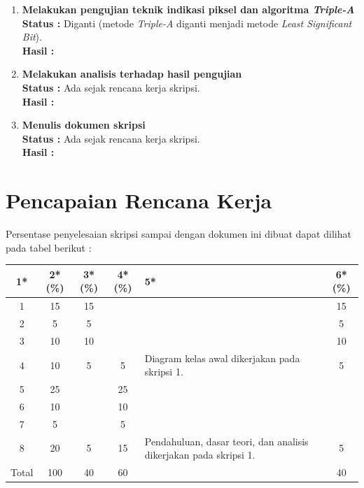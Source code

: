 \documentclass[a4paper,twoside]{article}
\begin{document}
\begin{enumerate}
		\item \textbf{Melakukan pengujian teknik indikasi piksel dan algoritma \textit{Triple-A}}\\
		{\bf Status :} Diganti (metode \textit{Triple-A} diganti menjadi metode \textit{Least Significant Bit}). \\
		{\bf Hasil :} 

		\item \textbf{Melakukan analisis terhadap hasil pengujian} \\
		{\bf Status :} Ada sejak rencana kerja skripsi.\\
		{\bf Hasil :}

		\item \textbf{Menulis dokumen skripsi}\\
		{\bf Status :} Ada sejak rencana kerja skripsi.\\
		{\bf Hasil :} 	

	\end{enumerate}

\section{Pencapaian Rencana Kerja}
Persentase penyelesaian skripsi sampai dengan dokumen ini dibuat dapat dilihat pada tabel berikut :

\begin{center}
  \begin{tabular}{ | c | c | c | c | l | c |}
    \hline
    1*  & 2*(\%) & 3*(\%) & 4*(\%) &5* & 6*(\%) \\ \hline \hline
    1   & 15 & 15 &  &  & 15 \\ \hline
    2   & 5 & 5 &  &  & 5 \\ \hline
    3   & 10 & 10 &  &  & 10 \\ \hline
    4   & 10 & 5 & 5 & {\footnotesize Diagram kelas awal dikerjakan pada skripsi 1.} & 5 \\ \hline
    5   & 25 &  & 25 & & \\ \hline
    6   & 10 &  & 10 & & \\ \hline
    7   & 5 &  & 5 & & \\ \hline    
    8	& 20 & 5 & 15 & {\footnotesize Pendahuluan, dasar teori, dan analisis dikerjakan pada skripsi 1.} &  5 \\ \hline
    Total  & 100  & 40  & 60 &  & 40 \\ \hline
	\end{tabular}
\end{center}
\end{document}
